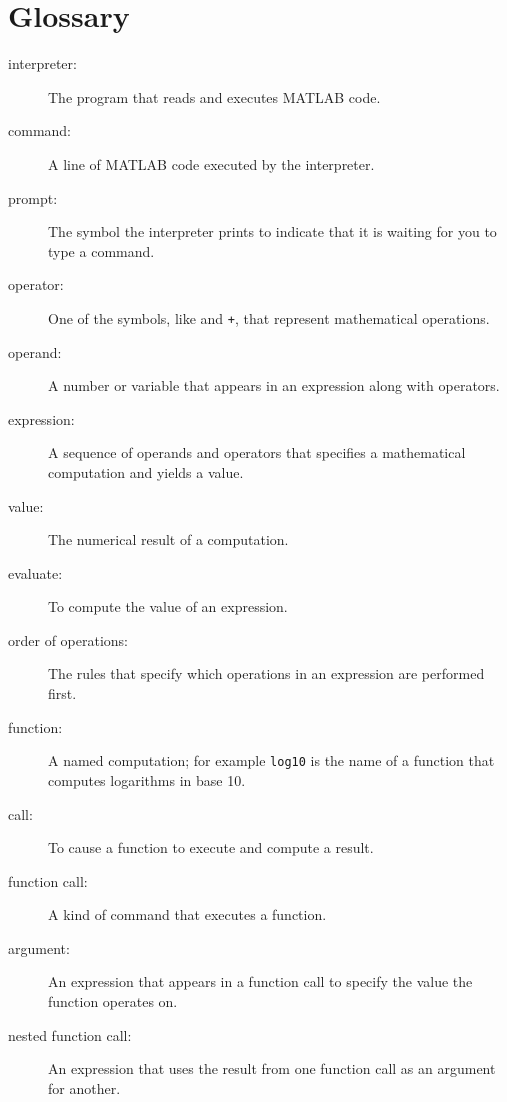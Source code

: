 \documentclass{book}
\begin{document}
\section{Glossary}

\begin{description}

\item[interpreter:] The program that reads and executes MATLAB code.

\item[command:] A line of MATLAB code executed by the interpreter.

\item[prompt:] The symbol the interpreter prints to indicate that it is
waiting for you to type a command.

\item[operator:] One of the symbols, like {\tt *} and {\tt +}, that
represent mathematical operations.

\item[operand:] A number or variable that appears in an expression along
with operators.

\item[expression:] A sequence of operands and operators that specifies
a mathematical computation and yields a value.

\item[value:] The numerical result of a computation.

\item[evaluate:] To compute the value of an expression.

\item[order of operations:] The rules that specify which operations
in an expression are performed first.

\item[function:] A named computation; for example {\tt log10} is the
name of a function that computes logarithms in base 10.

\item[call:] To cause a function to execute and compute a result.

\item[function call:] A kind of command that executes a function.

\item[argument:] An expression that appears in a function call to
specify the value the function operates on.

\item[nested function call:] An expression that uses the result from
one function call as an argument for another.


\end{description}
\end{document}
